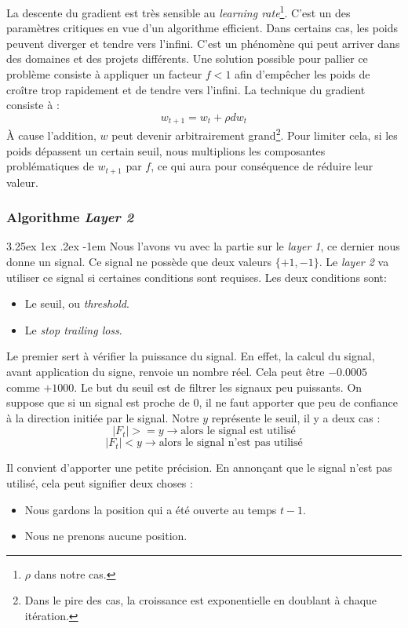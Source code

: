 \documentclass[a4paper, 11pt]{article}
\makeatletter
\renewcommand\paragraph{\@startsection{paragraph}{5}{\z@}%
  {3.25ex \@plus1ex \@minus.2ex}%
  {-1em}%
  {\normalfont\normalsize\bfseries}}
\makeatother
\begin{document}
La descente du gradient est très sensible au \textit{learning rate}\footnote{$\rho$ dans notre cas.}. C'est un des paramètres critiques en vue d'un algorithme efficient\cite{no_more_pesky_learning_rate}. Dans certains cas, les poids peuvent diverger et
tendre vers l'infini. C'est un phénomène qui peut arriver dans des domaines et des projets différents\cite{no_more_pesky_learning_rate}. Une solution possible pour pallier ce problème 
consiste à appliquer un facteur $f < 1$ afin d'empêcher les poids de croître trop rapidement et de tendre vers l'infini.
La technique du gradient consiste à :
$$w_{t+1} = w_{t} + \rho dw_{t}$$
À cause l'addition, $w$ peut devenir arbitrairement grand\footnote{Dans le pire des cas, la croissance est exponentielle en doublant à chaque itération.}. Pour limiter cela, si les poids dépassent un certain seuil, nous multiplions les composantes problématiques de $w_{t+1}$ par $f$, ce qui aura pour conséquence de réduire leur valeur.

\subsubsection{Algorithme \textit{Layer 2}}
\paragraph{}
Nous l'avons vu avec la partie sur le \textit{layer 1}, ce dernier nous donne un signal. Ce signal ne possède que deux valeurs $\{+1,-1\}$. Le
\textit{layer 2} va utiliser ce signal si certaines conditions sont requises.
Les deux conditions sont:
\begin{itemize}
 \item Le seuil, ou \textit{threshold}.
 \item Le \textit{stop trailing loss}.
\end{itemize}

Le premier sert à vérifier la puissance du signal. En effet, la calcul du signal, avant application du signe, renvoie un nombre réel. Cela peut être
$-0.0005$ comme $+1000$. Le but du seuil est de filtrer les signaux peu puissants. On suppose que si un signal est proche de 0, il ne faut apporter que
peu de confiance à la direction initiée par le signal. Notre $y$ représente le seuil, il y a deux cas :
$$|F_t | >= y \rightarrow \text{alors le signal est utilisé}$$
$$|F_t | < y \rightarrow \text{alors le signal n'est pas utilisé}$$

Il convient d'apporter une petite précision. En annonçant que le signal n'est pas utilisé, cela peut signifier deux choses :
\begin{itemize}
 \item Nous gardons la position qui a été ouverte au temps $t-1$.
 \item Nous ne prenons aucune position.
\end{itemize}
\end{document}
